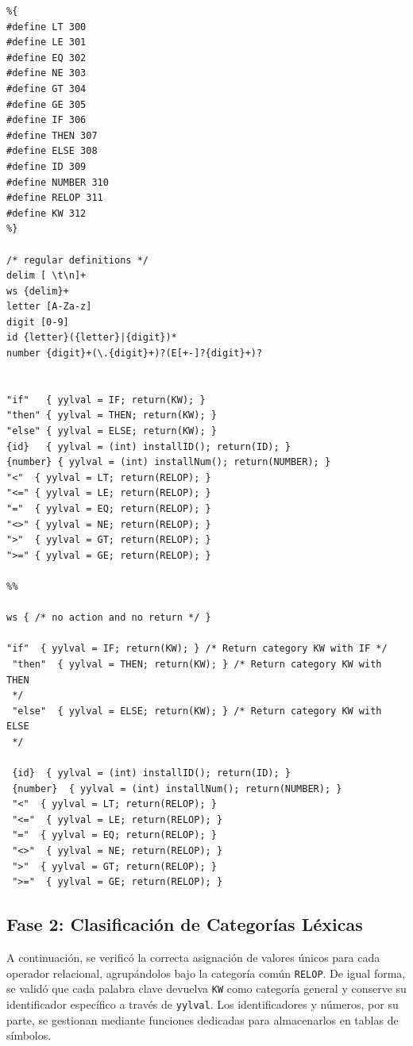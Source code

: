 \documentclass{article}
\begin{document}
\begin{verbatim}
%{
#define LT 300
#define LE 301
#define EQ 302
#define NE 303
#define GT 304
#define GE 305
#define IF 306
#define THEN 307
#define ELSE 308
#define ID 309
#define NUMBER 310
#define RELOP 311
#define KW 312
%}

/* regular definitions */
delim [ \t\n]+
ws {delim}+
letter [A-Za-z]
digit [0-9]
id {letter}({letter}|{digit})*
number {digit}+(\.{digit}+)?(E[+-]?{digit}+)?


"if"   { yylval = IF; return(KW); }
"then" { yylval = THEN; return(KW); }
"else" { yylval = ELSE; return(KW); }
{id}   { yylval = (int) installID(); return(ID); }
{number} { yylval = (int) installNum(); return(NUMBER); }
"<"  { yylval = LT; return(RELOP); }
"<=" { yylval = LE; return(RELOP); }
"="  { yylval = EQ; return(RELOP); }
"<>" { yylval = NE; return(RELOP); }
">"  { yylval = GT; return(RELOP); }
">=" { yylval = GE; return(RELOP); }

%%

ws { /* no action and no return */ }

"if"  { yylval = IF; return(KW); } /* Return category KW with IF */
 "then"  { yylval = THEN; return(KW); } /* Return category KW with THEN
 */
 "else"  { yylval = ELSE; return(KW); } /* Return category KW with ELSE
 */
 
 {id}  { yylval = (int) installID(); return(ID); }
 {number}  { yylval = (int) installNum(); return(NUMBER); }
 "<"  { yylval = LT; return(RELOP); }
 "<="  { yylval = LE; return(RELOP); }
 "="  { yylval = EQ; return(RELOP); }
 "<>"  { yylval = NE; return(RELOP); }
 ">"  { yylval = GT; return(RELOP); }
 ">="  { yylval = GE; return(RELOP); }

\end{verbatim}

\subsection*{Fase 2: Clasificación de Categorías Léxicas}

A continuación, se verificó la correcta asignación de valores únicos para cada operador relacional, agrupándolos bajo la categoría común \texttt{RELOP}. De igual forma, se validó que cada palabra clave devuelva \texttt{KW} como categoría general y conserve su identificador específico a través de \texttt{yylval}. Los identificadores y números, por su parte, se gestionan mediante funciones dedicadas para almacenarlos en tablas de símbolos.
\end{document}
